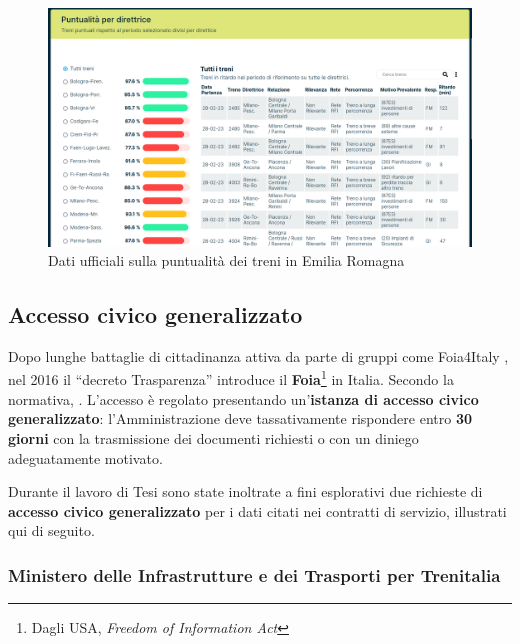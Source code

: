 \documentclass[12pt,italian]{report}
\begin{document}
\begin{figure}[h] \centering
    \includegraphics[width=1\textwidth]{images/fer_dati.png}
	\caption{Dati ufficiali sulla puntualità dei treni in Emilia
        Romagna \cite{FerDati}}
    \label{fer_dati}
\end{figure}


\subsection{Accesso civico generalizzato}
\label{foia}

Dopo lunghe battaglie di cittadinanza attiva da parte di gruppi come
Foia4Italy \cite{SilenziDiStato}, nel 2016 il ``decreto Trasparenza''
\cite{Dlgs97} introduce il \textbf{Foia}\footnote{Dagli USA,
    \textit{Freedom of Information Act}} in Italia.  Secondo la
normativa, .
L'accesso è regolato presentando un'\textbf{istanza di accesso civico
    generalizzato}: l'Amministrazione deve tassativamente rispondere
entro \textbf{30 giorni} con la trasmissione dei documenti richiesti o
con un diniego adeguatamente motivato.

Durante il lavoro di Tesi sono state inoltrate a fini esplorativi due
richieste di \textbf{accesso civico generalizzato} per i dati citati
nei contratti di servizio, illustrati qui di seguito.

\subsubsection{Ministero delle Infrastrutture e dei Trasporti per
    Trenitalia}
\end{document}
